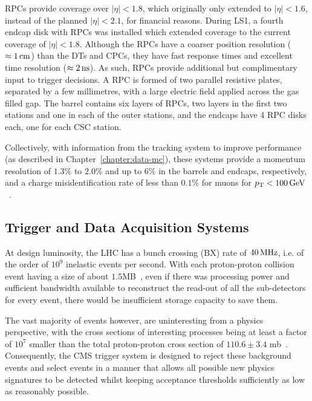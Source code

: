RPCs provide coverage over $|\eta| < 1.8$, which originally only extended to $|\eta| < 1.6$, instead of the planned $|\eta| < 2.1$, for financial reasons. 
During LS1, a fourth endcap disk with RPCs was installed which extended coverage to the current coverage of $|\eta| < 1.8$\cite{Battilana:2017mrm}.
Although the RPCs have a coarser position resolution ($\approx 1\,\text{cm}$) than the DTs and CPCs, they have fast response times and excellent time resolution ($\approx 2\text{\,ns}$).
As such, RPCs provide additional but complimentary input to trigger decisions.
A RPC is formed of two parallel resistive plates, separated by a few millimetres, with a large electric field applied across the gas filled gap.
The barrel contains six layers of RPCs, two layers in the first two stations and one in each of the outer stations, and the endcaps have 4 RPC disks each, one for each CSC station.

Collectively, with information from the tracking system to improve performance (as described in Chapter~\ref{chapter:data-mc}), these systems provide a momentum resolution of $1.3\%$ to $2.0\%$ and up to $6\%$ in the barrels and endcaps, respectively, and a charge misidentification rate of less than $0.1\%$ for muons for $p_{\mathrm{T}} < 100 \,\text{Ge\hspace{-.08em}V}$~\cite{Chatrchyan:2012xi,Chatrchyan:2013sba}.

\subsection{Trigger and Data Acquisition Systems}\label{subsec:trigger}
At design luminosity, the LHC has a bunch crossing (BX) rate of $40\text{\,MHz}$, i.e. of the order of $10^{9}$ inelastic events per second.
With each proton-proton collision event having a size of about $1.5$MB~\cite{Bayatian:2006nff}, even if there was processing power and sufficient bandwidth available to reconstruct the read-out of all the sub-detectors for every event, there would be insufficient storage capacity to save them.

The vast majority of events however, are uninteresting from a physics perspective, with the cross sections of interesting processes being at least a factor of $10^{7}$ smaller than the total proton-proton cross section of $110.6 \pm 3.4$ mb~\cite{Antchev:2017dia}.
Consequently, the CMS trigger system is designed to reject these background events and select events in a manner that allows all possible new physics signatures to be detected whilst keeping acceptance thresholds sufficiently as low as reasonably possible.

